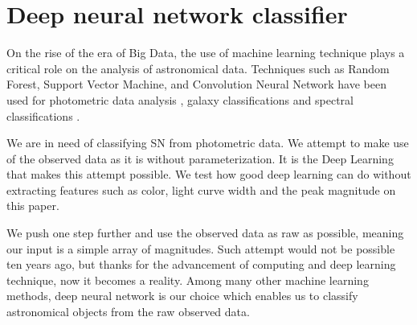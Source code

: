 \documentclass[useamsfonts]{pasj01}
\begin{document}
\section{Deep neural network classifier}
\label{sec:DNN}
On the rise of the era of Big Data, the use of machine learning technique plays a critical role on the analysis of astronomical data.  Techniques such as Random Forest, Support Vector Machine, and Convolution Neural Network have been used for photometric data analysis \citep{pasquet19a}, galaxy classifications \citep{hausen19a} and spectral 
classifications \citep{garciadias18a,muthukrishna19c,sharma20a}.

We are in need of classifying SN from photometric data.
We attempt to make use of the observed data as it is without parameterization.
It is the Deep Learning that makes this attempt possible.
We test how good deep learning can do without extracting features such as color, light curve width and the peak magnitude on this paper.

We push one step further and use the observed data as raw as possible, meaning our input is a simple array of magnitudes.  Such attempt would not be possible ten years ago, but thanks for the advancement of computing and deep learning technique, now it becomes a reality.  Among many other machine learning methods, deep neural network is our choice which enables us to classify astronomical objects from the raw observed data. 
\end{document}
